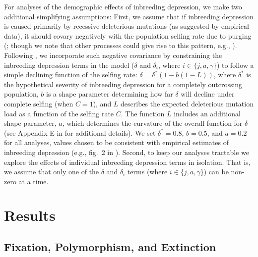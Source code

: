 \documentclass[11pt,draft]{article}
\begin{document}
For analyses of the demographic effects of inbreeding depression, we make two additional simplifying assumptions: First, we assume that if inbreeding depression is caused primarily by recessive deleterious mutations (as suggested by empirical data), it should covary negatively with the population selfing rate due to purging (\citealt{Charlesworth2009}; though we note that other processes could give rise to this pattern, e.g., \citealt{CrnokrakBarrett2002, Charlesworth2009,HedrickGarcia-Dorado2016}). Following \citet{Olito2019}, we incorporate such negative covariance by constraining the inbreeding depression terms in the model ($\delta$ and $\delta_i$, where $i \in \{j,a,\gamma\}$) to follow a simple declining function of the selfing rate: $\delta = \delta^{\ast} (1 - b (1 - L))$, where $\delta^{\ast}$ is the hypothetical severity of inbreeding depression for a completely outcrossing population, $b$ is a shape parameter determining how far $\delta$ will decline under complete selfing (when $C = 1$), and $L$ describes the expected deleterious mutation load as a function of the selfing rate $C$. The function $L$ includes an additional shape parameter, $a$, which determines the curvature of the overall function for $\delta$ (see Appendix E in \citealt{Olito2019} for additional details). We set $\delta^{\ast} = 0.8$, $b = 0.5$, and $a = 0.2$ for all analyses, values chosen to be consistent with empirical estimates of inbreeding depression (e.g., fig.~2 in \citealt{HusbandSchemske1996}). Second, to keep our analyses tractable we explore the effects of individual inbreeding depression terms in isolation. That is, we assume that only one of the $\delta$ and $\delta_i$ terms (where $i \in \{j,a,\gamma\}$) can be non-zero at a time.





\section*{Results}\label{sec:Results}

\subsection*{Fixation, Polymorphism, and Extinction}\label{subsec:PolyExt}
\end{document}
